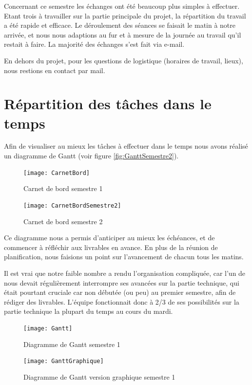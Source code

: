 Concernant ce semestre les échanges ont été beaucoup plus simples à effectuer. Etant trois à travailler sur la partie principale du projet, la répartition du travail a été rapide et efficace. Le déroulement des séances se faisait le matin à notre arrivée, et nous nous adaptions au fur et à mesure de la journée au travail qu’il restait à faire.
La majorité des échanges s'est fait via e-mail.
 
En dehors du projet, pour les questions de logistique (horaires de travail, lieux), nous restions en contact par mail. 

\section{Répartition des tâches dans le temps}

Afin de visualiser au mieux les tâches à effectuer dans le temps nous avons réalisé un diagramme de Gantt (voir figure \ref{fig:GanttSemestre2}).
 
\begin{figure}[H]
  \centering
  \texttt{[image: CarnetBord]}
  \caption{Carnet de bord semestre 1}
  \label{fig:CarnetBord}
\end{figure}

\begin{figure}[H]
  \centering
  \texttt{[image: CarnetBordSemestre2]}
  \caption{Carnet de bord semestre 2}
  \label{fig:CarnetBordS2}
\end{figure}
 
Ce diagramme nous a permis d’anticiper au mieux les échéances, et de commencer à réfléchir aux livrables en avance. En plus de la réunion de planification, nous faisions un point sur l’avancement de chacun tous les matins.

Il est vrai que notre faible nombre a rendu l’organisation compliquée, car l’un de nous devait régulièrement interrompre ses avancées sur la partie technique, qui était pourtant cruciale car non débutée (ou peu) au premier semestre, afin de rédiger des livrables. L’équipe fonctionnait donc à 2/3 de ses possibilités sur la partie technique la plupart du temps au cours du mardi.
 
\begin{figure}[H]
  \centering
  \texttt{[image: Gantt]}
  \caption{Diagramme de Gantt semestre 1}
  \label{fig:Gantt}
\end{figure}

\begin{figure}[H]
  \centering
  \texttt{[image: GanttGraphique]}
  \caption{Diagramme de Gantt version graphique semestre 1}
  \label{fig:GanttGraphique}
\end{figure}


